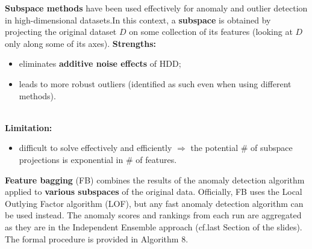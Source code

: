 \documentclass[20pt,landscape,footrule,headrule]{foils}
\newcommand{\newl}{\newline\newline}
\def\fh{\foilhead}
\begin{document}
{{\fh{6.4.3 -- Subspace  Methods} \label{6.4.3}
\noindent \textbf{Subspace methods} have been used effectively for anomaly and outlier detection in high-dimen\-sional datasets.\newl In this context, a \textbf{subspace} is obtained by projecting the original dataset $D$ on some collection of its features (looking at $D$ only along some of its axes). 
\newl \textbf{Strengths:} 
\begin{itemize}
\item eliminates \textbf{additive noise effects} of HDD;
\item leads to more robust outliers (identified as such even when using different methods).
\end{itemize}
\newpage\ \\ \noindent \textbf{Limitation:} \begin{itemize}
\item difficult to solve effectively and efficiently $\Longrightarrow$ the potential \# of subspace projections is exponential in  \# of features. \end{itemize} \textbf{Feature bagging} (FB) combines the results of the anomaly detection algorithm applied to \textbf{various subspaces} of the original data. \newl Officially, FB uses the Local Outlying Factor algorithm (LOF), but any fast anomaly detection algorithm can be used instead. \newl The anomaly scores and rankings from each run are aggregated as they are in the Independent Ensemble approach (cf.\@ last Section of the slides).\newl 
The formal procedure is provided in Algorithm 8.

}}
\end{document}
